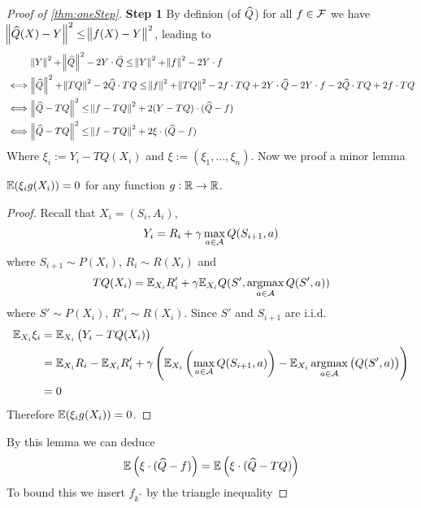 \begin{proof}[Proof of \cref{thm:oneStep}]
  \textbf{Step 1}
  By definion (of $\widehat{Q}$) for all $f \in \mathcal{F}$ we have
  $\norm{\widehat{Q}(X) - Y}^2 \leq \norm{f(X) - Y}^2$, leading to
  \begin{align}
    & \norm{Y}^2 + \norm{\widehat{Q}}^2 - 2 Y\cdot \widehat{Q}
    \leq \norm{Y}^2 + \norm{f}^2 - 2 Y\cdot f
    \\ \iff & \norm{\widehat{Q}}^2 + \norm{TQ}^2 - 2 \widehat{Q}\cdot TQ 
    \leq \norm{f}^2 + \norm{TQ}^2 - 2 f\cdot TQ + 2 Y\cdot \widehat{Q}
    - 2 Y \cdot f - 2 \widehat{Q}\cdot TQ + 2f\cdot TQ
    \\ \iff & \norm{\widehat{Q} - TQ}^2
    \leq \norm{f - TQ}^2 + 2(Y - TQ)\cdot(\widehat{Q} - f) 
    \\ \iff & \norm{\widehat{Q} - TQ}^2
    \leq \norm{f - TQ}^2 + 2 \xi \cdot (\widehat{Q} - f)
    \label{eq:c2first}
  \end{align}
  Where $ \xi_i := Y_i - TQ(X_i) $ and $\xi := (\xi_1, \dots, \xi_n)$.
  Now we proof a minor lemma
  \begin{prop}
    $\mathbb{E}(\xi_i g(X_i)) = 0$ for any function $g:\mathbb{R}\to \mathbb{R}$.
    \label{lem:YTQ}
  \end{prop}
  \begin{proof}
    Recall that $X_i = (S_i, A_i)$,
    \begin{align*}
      Y_i = R_i + \gamma \max_{a \in \mathcal{A}} Q(S_{i+1}, a)
    \end{align*}
    where $S_{i+1} \sim P(X_i)$, $R_i \sim R(X_i)$ and
    \begin{align*}
      TQ(X_i) = \mathbb{E}_{X_i} R'_i
      + \gamma \mathbb{E}_{X_i} Q(S', \operatorname*{argmax}_{a \in \mathcal{A}} Q(S', a))
    \end{align*}
    where $S' \sim P(X_i)$, $R'_i \sim R(X_i)$.
    Since $S'$ and $S_{i+1}$ are i.i.d.
    \begin{align*}
      \mathbb{E}_{X_i} \xi_i & = \mathbb{E}_{X_i} \left( Y_i - TQ(X_i) \right)
      \\ & = \mathbb{E}_{X_i} R_i - \mathbb{E}_{X_i} R'_i
      + \gamma \left( \mathbb{E}_{X_i} \left( \max_{a \in\mathcal{A}} Q(S_{i+1}, a) \right)
      - \mathbb{E}_{X_i} \operatorname*{argmax}_{a \in \mathcal{A}} \left(  Q(S', a) \right) \right)
      \\ & = 0 
    \end{align*}
    Therefore $\mathbb{E}(\xi_i g(X_i)) = 0$.
  \end{proof}
  By this lemma we can deduce
  \begin{equation}
    \mathbb{E} \left( \xi \cdot (\widehat{Q} - f) \right)
    = \mathbb{E} \left( \xi \cdot (\widehat{Q} - TQ) \right)
  \end{equation}
  To bound this we insert $f_{k^*}$ by the triangle inequality

\end{proof}
